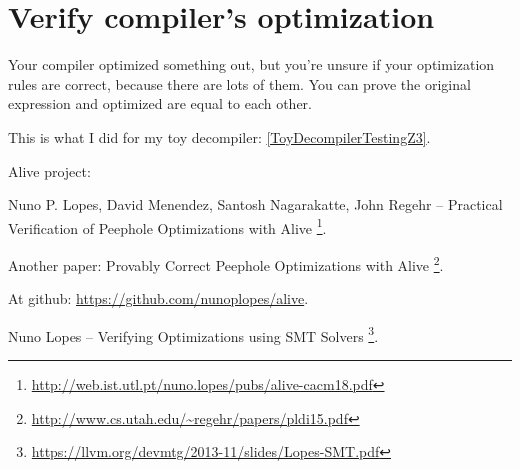 \section{Verify compiler's optimization}

Your compiler optimized something out, but you're unsure if your optimization rules are correct, because there are lots of them.
You can prove the original expression and optimized are equal to each other.

This is what I did for my toy decompiler: \ref{ToyDecompilerTestingZ3}.

Alive project:

Nuno P. Lopes, David Menendez, Santosh Nagarakatte, John Regehr -- Practical Verification of Peephole Optimizations with Alive
\footnote{\url{http://web.ist.utl.pt/nuno.lopes/pubs/alive-cacm18.pdf}}.

Another paper: Provably Correct Peephole Optimizations with Alive
\footnote{\url{http://www.cs.utah.edu/~regehr/papers/pldi15.pdf}}.

At github: \url{https://github.com/nunoplopes/alive}.

Nuno Lopes -- Verifying Optimizations using SMT Solvers
\footnote{\url{https://llvm.org/devmtg/2013-11/slides/Lopes-SMT.pdf}}.

